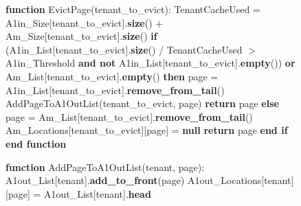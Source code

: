 \begin{figure}[htbp]
\begin{minipage}{\linewidth}
\begin{algorithm}[H]
\begin{algorithmic}
            \STATE
            \STATE \textbf{function} EvictPage(tenant\_to\_evict):
            \STATE \hspace{\algorithmicindent} TenantCacheUsed = A1in\_Size[tenant\_to\_evict].\textbf{size}() + Am\_Size[tenant\_to\_evict].\textbf{size}()
            \STATE \hspace{\algorithmicindent} \textbf{if} (A1in\_List[tenant\_to\_evict].\textbf{size}() / TenantCacheUsed $>$ A1in\_Threshold \textbf{and not} A1in\_List[tenant\_to\_evict].\textbf{empty}()) \textbf{or} Am\_List[tenant\_to\_evict].\textbf{empty}() \textbf{then}
            \STATE \hspace{\algorithmicindent} \hspace{\algorithmicindent} page = A1in\_List[tenant\_to\_evict].\textbf{remove\_from\_tail}()
            \STATE \hspace{\algorithmicindent} \hspace{\algorithmicindent} AddPageToA1OutList(tenant\_to\_evict, page)
            \STATE \hspace{\algorithmicindent} \hspace{\algorithmicindent} \textbf{return} page
            \STATE \hspace{\algorithmicindent} \textbf{else}
            \STATE \hspace{\algorithmicindent} \hspace{\algorithmicindent} page = Am\_List[tenant\_to\_evict].\textbf{remove\_from\_tail}()
            \STATE \hspace{\algorithmicindent} \hspace{\algorithmicindent} Am\_Locations[tenant\_to\_evict][page] = \textbf{null}
            \STATE \hspace{\algorithmicindent} \hspace{\algorithmicindent} \textbf{return} page
            \STATE \hspace{\algorithmicindent} \textbf{end if}
            \STATE \textbf{end function}
        \end{algorithmic}
    \end{algorithm}
    \begin{algorithm}[H]
        \begin{algorithmic}
            \STATE \textbf{function} AddPageToA1OutList(tenant, page):
            \STATE \hspace{\algorithmicindent} \hspace{\algorithmicindent} A1out\_List[tenant].\textbf{add\_to\_front}(page)
            \STATE \hspace{\algorithmicindent} \hspace{\algorithmicindent} A1out\_Locations[tenant][page] = A1out\_List[tenant].\textbf{head}

\end{algorithmic}
\end{algorithm}
\end{minipage}
\end{figure}
